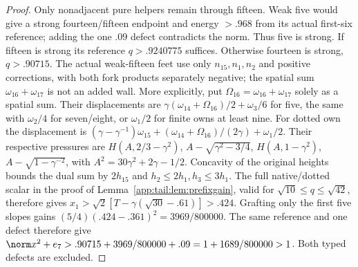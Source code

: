 \begin{proof}
Only nonadjacent pure helpers remain through fifteen.
Weak five would give a strong fourteen/fifteen endpoint and
energy $>.968$ from its actual first-six reference; adding
the one $.09$ defect contradicts the norm. Thus five is strong.
If fifteen is strong its reference $q>.9240775$ suffices.
Otherwise fourteen is strong, $q>.90715$.
The actual weak-fifteen feet use only $n_{15},n_1,n_2$ and
positive corrections, with both fork products separately
negative; the spatial sum $\omega_{16}+\omega_{17}$ is not
an added wall. More explicitly, put
$\Omega_{16}=\omega_{16}+\omega_{17}$ solely as a spatial sum.
Their displacements are
$\gamma(\omega_{14}+\Omega_{16})/2+\omega_3/6$ for five,
the same with $\omega_2/4$ for seven/eight, or $\omega_1/2$
for finite owns at least nine. For dotted own the displacement is
$(\gamma-\gamma^{-1})\omega_{15}
+(\omega_{14}+\Omega_{16})/(2\gamma)+\omega_1/2$.
Their respective pressures are
$H(A,2/3-\gamma^2)$, $A-\sqrt{\gamma^2-3/4}$,
$H(A,1-\gamma^2)$, $A-\sqrt{1-\gamma^{-2}}$,
with $A^2=30\gamma^2+2\gamma-1/2$.
Concavity of the original heights bounds the dual sum by
$2h_{15}$ and $h_2\le2h_1,h_3\le3h_1$.
The full native/dotted scalar in the proof of
Lemma~\ref{app:tail:lem:prefixgain}, valid for
$\sqrt{10}\le q\le\sqrt{42}$, therefore gives
$x_1>\sqrt2[T-\gamma(\sqrt{30}-.61)]>.424$.
Grafting only the first five slopes gains
$(5/4)(.424-.361)^2=3969/800000$.
The same reference and one defect therefore give
$\norm x^2+e_7>.90715+3969/800000+.09
=1+1689/800000>1$. Both typed defects are excluded.
\end{proof}

